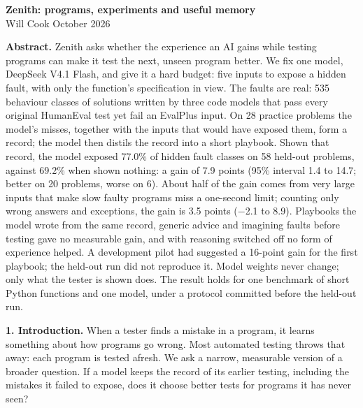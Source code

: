 \documentclass[11pt]{article}
\begin{document}
\begin{center}
{\Large\bfseries Zenith: programs, experiments and useful memory}\\[4pt]
Will Cook \quad\textbullet{} October 2026
\end{center}
\begingroup
\renewcommand{\thefootnote}{*}
\endgroup
\hypertarget{idea}{}
\textbf{Abstract.}
Zenith asks whether the experience an AI gains while testing programs can make
it test the next, unseen program better. We fix one model, DeepSeek V4.1 Flash,
and give it a hard budget: five inputs to expose a hidden fault, with only the
function's specification in view. The faults are real: 535 behaviour classes
of solutions written by three code models that pass every original HumanEval
test yet fail an EvalPlus input. On 28 practice problems the model's misses,
together with the inputs that would have exposed them, form a record; the model
then distils the record into a short playbook. Shown that record, the model exposed 77.0\% of hidden fault classes on 58
held-out problems, against 69.2\% when shown nothing: a gain of 7.9 points (95\%
interval 1.4 to 14.7; better on 20 problems, worse on 6). About half of the gain
comes from very large inputs that make slow faulty programs miss a one-second
limit; counting only wrong answers and exceptions, the gain is 3.5 points
($-$2.1 to 8.9). Playbooks the model wrote from the same record, generic advice and
imagining faults before testing gave no measurable gain, and with reasoning
switched off no form of experience helped. A development pilot had suggested a
16-point gain for the first playbook; the held-out run did not reproduce it.
Model weights never change; only what the tester is shown does. The result
holds for one benchmark of short Python functions and one model, under a
protocol committed before the held-out run.

\hypertarget{intro}{}
\textbf{1. Introduction.}
When a tester finds a mistake in a program, it learns something about how
programs go wrong. Most automated testing throws that away: each program is
tested afresh. We ask a narrow, measurable version of a broader question. If a
model keeps the record of its earlier testing, including the mistakes it failed
to expose, does it choose better tests for programs it has never seen?
\end{document}
